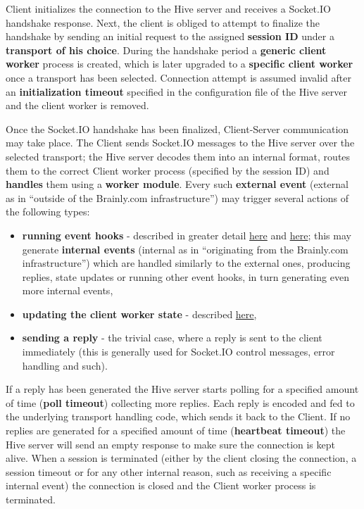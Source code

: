 \documentclass[a4paper]{article}
\begin{document}
\noindent
Client initializes the connection to the Hive server and receives a Socket.IO handshake response. Next, the client is obliged to attempt to finalize the handshake by sending an initial request to the assigned \textbf{session ID} under a \textbf{transport of his choice}. During the handshake period a \textbf{generic client worker} process is created, which is later upgraded to a \textbf{specific client worker} once a transport has been selected. Connection attempt is assumed invalid after an \textbf{initialization timeout} specified in the configuration file of the Hive server and the client worker is removed.

Once the Socket.IO handshake has been finalized, Client-Server communication may take place. The Client sends Socket.IO messages to the Hive server over the selected transport; the Hive server decodes them into an internal format, routes them to the correct Client worker process (specified by the session ID) and \textbf{handles} them using a \textbf{worker module}. Every such \textbf{external event} (external as in ``outside of the Brainly.com infrastructure'') may trigger several actions of the following types:


\begin{itemize}
\item \textbf{running event hooks} - described in greater detail \hyperref[sec-7-1-4]{here} and \hyperref[sec-9-2]{here}; this may generate \textbf{internal events} (internal as in ``originating from the Brainly.com infrastructure'') which are handled similarly to the external ones, producing replies, state updates or running other event hooks, in turn generating even more internal events,
\item \textbf{updating the client worker state} - described \hyperref[sec-7-1-5]{here},
\item \textbf{sending a reply} - the trivial case, where a reply is sent to the client immediately (this is generally used for Socket.IO control messages, error handling and such).
\end{itemize}

\noindent
If a reply has been generated the Hive server starts polling for a specified amount of time (\textbf{poll timeout}) collecting more replies. Each reply is encoded and fed to the underlying transport handling code, which sends it back to the Client.
If no replies are generated for a specified amount of time (\textbf{heartbeat timeout}) the Hive server will send an empty response to make sure the connection is kept alive.
When a session is terminated (either by the client closing the connection, a session timeout or for any other internal reason, such as receiving a specific internal event) the connection is closed and the Client worker process is terminated.
\end{document}
